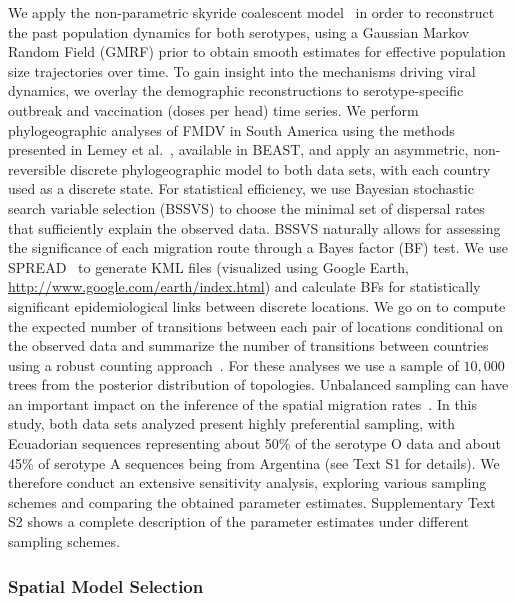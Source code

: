 \documentclass[10pt]{article}
\begin{document}
We apply the non-parametric skyride coalescent model~\citep{Minin2008a} in order to reconstruct the past population dynamics for both serotypes, using a Gaussian Markov Random Field (GMRF) prior to obtain smooth estimates for effective population size trajectories over time.
To gain insight into the mechanisms driving viral dynamics, we overlay the demographic reconstructions to serotype-specific outbreak and vaccination (doses per head) time series.
We perform phylogeographic analyses of FMDV in South America using the methods presented in Lemey et al.~\citep{Lemey2009}, available in BEAST, and apply an asymmetric, non-reversible discrete phylogeographic model to both data sets, with each country used as a discrete state.
For statistical efficiency, we use Bayesian stochastic search variable selection (BSSVS) to choose the minimal set of dispersal rates that sufficiently explain the observed data.
BSSVS naturally allows for assessing the significance of each migration route through a Bayes factor (BF) test.
We use SPREAD~\citep{Bielejec2011} to generate KML files (visualized using Google Earth, \url{http://www.google.com/earth/index.html}) and calculate BFs for statistically significant epidemiological links between discrete locations.
We go on to compute the expected number of transitions between each pair of locations conditional on the observed data and summarize the number of transitions between countries using a robust counting approach~\citep{Minin2008b}.
For these analyses we use a sample of $10,000$ trees from the posterior distribution of topologies.
Unbalanced sampling can have an important impact on the inference of the spatial migration rates~\citep{Faria2012, Lemey2014, Frost2015}.
In this study, both data sets analyzed present highly preferential sampling, with Ecuadorian sequences representing about 50\% of the serotype O data and about 45\% of serotype A sequences being from Argentina (see Text S1 for details).
We therefore conduct an extensive sensitivity analysis, exploring various sampling schemes and comparing the obtained parameter estimates.
Supplementary Text S2 shows a complete description of the parameter estimates under different sampling schemes. 

\subsubsection*{Spatial Model Selection}
\end{document}
